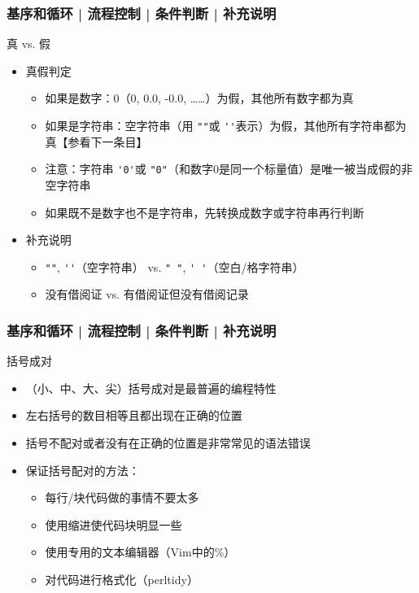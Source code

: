 \begin{frame}[fragile]
  \frametitle{基序和循环 | 流程控制 | 条件判断 | \alert{补充说明}}
  \begin{block}{真 vs. 假}
    \begin{itemize}
      \item 真假判定
       	\begin{itemize}
	        \item 如果是数字：0（0, 0.0, -0.0, ……）为假，其他所有数字都为真
          \item 如果是字符串：空字符串（用 \verb|""|或 \verb|''|表示）为假，其他所有字符串都为真【参看下一条目】
          \item 注意：字符串 \verb|'0'|或 \verb|"0"|（和数字0是同一个标量值）是唯一被当成假的非空字符串
	        \item 如果既不是数字也不是字符串，先转换成数字或字符串再行判断
        \end{itemize}
      \item 补充说明
       	\begin{itemize}
          \item \verb|""|, \verb|''|（空字符串） vs. \verb|" "|, \verb|' '|（空白/格字符串）
          \item 没有借阅证 vs. 有借阅证但没有借阅记录
        \end{itemize}
    \end{itemize}
  \end{block}
\end{frame}

\begin{frame}
  \frametitle{基序和循环 | 流程控制 | 条件判断 | 补充说明}
  \begin{block}{括号成对}
    \begin{itemize}
	\item （小、中、大、尖）括号成对是最普遍的编程特性
	\item 左右括号的数目相等且都出现在正确的位置
	\item 括号不配对或者没有在正确的位置是非常常见的语法错误
	\item 保证括号配对的方法：
	  \begin{itemize}
	    \item 每行/块代码做的事情不要太多
	    \item 使用缩进使代码块明显一些
	    \item 使用专用的文本编辑器（Vim中的\%）
	    \item 对代码进行格式化（perltidy）
	  \end{itemize}
    \end{itemize}
  \end{block}
\end{frame}

